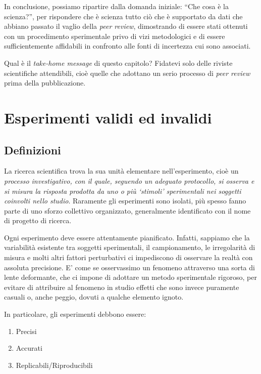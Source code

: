 \documentclass[a4paper,12pt,oneside]{book}
\providecommand{\tightlist}{%
  \setlength{\itemsep}{0pt}\setlength{\parskip}{0pt}}
\theoremstyle{definition}
\theoremstyle{definition}
\theoremstyle{definition}
\theoremstyle{remark}
\begin{document}
In conclusione, possiamo ripartire dalla domanda iniziale: ``Che cosa è
la scienza?'', per rispondere che è scienza tutto ciò che è supportato
da dati che abbiano passato il vaglio della \emph{peer review},
dimostrando di essere stati ottenuti con un procedimento sperimentale
privo di vizi metodologici e di essere sufficientemente affidabili in
confronto alle fonti di incertezza cui sono associati.

Qual è il \emph{take-home message} di questo capitolo? Fidatevi solo
delle riviste scientifiche attendibili, cioè quelle che adottano un
serio processo di \emph{peer review} prima della pubblicazione.

\chapter{Esperimenti validi ed
invalidi}\label{esperimenti-validi-ed-invalidi}

\section{Definizioni}\label{definizioni}

La ricerca scientifica trova la sua unità elementare nell'esperimento,
cioè un \emph{processo investigativo, con il quale, seguendo un adeguato
protocollo, si osserva e si misura la risposta prodotta da uno o più
`stimoli' sperimentali nei soggetti coinvolti nello studio}. Raramente
gli esperimenti sono isolati, più spesso fanno parte di uno sforzo
collettivo organizzato, generalmente identificato con il nome di
progetto di ricerca.

Ogni esperimento deve essere attentamente pianificato. Infatti, sappiamo
che la variabilità esistente tra soggetti sperimentali, il
campionamento, le irregolarità di misura e molti altri fattori
perturbativi ci impediscono di osservare la realtà con assoluta
precisione. E' come se osservassimo un fenomeno attraverso una sorta di
lente deformante, che ci impone di adottare un metodo sperimentale
rigoroso, per evitare di attribuire al fenomeno in studio effetti che
sono invece puramente casuali o, anche peggio, dovuti a qualche elemento
ignoto.

In particolare, gli esperimenti debbono essere:

\begin{enumerate}
\def\labelenumi{\arabic{enumi}.}
\tightlist
\item
  Precisi
\item
  Accurati
\item
  Replicabili/Riproducibili
\end{enumerate}
\end{document}
